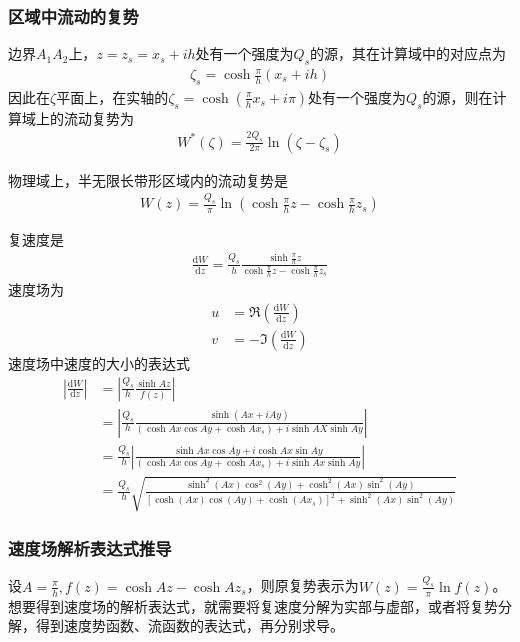 \subsubsection{区域中流动的复势}
边界$A_{1}A_{2}$上，$z=z_{s}=x_{s}+ih$处有一个强度为$Q_{s}$的源，其在计算域中的对应点为
\begin{align}
    \zeta_{s}=\cosh\frac{\pi}{h}(x_{s }+ih)
\end{align}
因此在$\zeta$平面上，在实轴的$\zeta_{s}=\cosh(\frac{\pi}{h}x_{s}+i\pi)$处有一个强度为$Q_{s}$的源，则在计算域上的流动复势为
\begin{align}
    W^{*}(\zeta)=\frac{2Q_{s}}{2\pi}\ln(\zeta-\zeta_{s})
\end{align}

物理域上，半无限长带形区域内的流动复势是
\begin{align}
    W(z)=\frac{Q_{s}}{\pi}\ln(\cosh\frac{\pi}{h}z-\cosh\frac{\pi}{h}z_{s})
\end{align}

复速度是
\begin{align}
    \frac{\mathrm{d}W}{\mathrm{d}z}=\frac{Q_{s}}{h}\frac{\sinh\frac{\pi}{h}z}{\cosh\frac{\pi}{h}z-\cosh\frac{\pi}{h}z_{s}}
\end{align}
速度场为
\begin{align}
    u&=\Re\left(\frac{\mathrm{d}W}{\mathrm{d}z}\right)\\
    v&=-\Im\left(\frac{\mathrm{d}W}{\mathrm{d}z}\right)
\end{align}
速度场中速度的大小的表达式
\begin{align}
    \left|\frac{\mathrm{d}W}{\mathrm{d}z}\right|&=\left|\frac{Q_{s}}{h}\frac{\sinh Az}{f(z)}\right|\\
    &=\left|\frac{Q_{s}}{h}\frac{\sinh(Ax+iAy)}{(\cosh Ax\cos Ay+\cosh Ax_{s})+i\sinh AX\sinh Ay}\right|\\
    &=\frac{Q_{s}}{h}\left|\frac{\sinh Ax\cos Ay+i\cosh Ax\sin Ay}{(\cosh Ax\cos Ay+\cosh Ax_{s})+i\sinh Ax\sinh Ay}\right|\\
    &=\frac{Q_{s}}{h}\sqrt{\frac{                        \sinh^2(Ax)\cos^2(Ay) + \cosh^2(Ax)\sin^2(Ay)}{                        \left[ \cosh(Ax)\cos(Ay) + \cosh(Ax_s) \right]^2 + \sinh^2(Ax)\sin^2(Ay)}}
\end{align}

\subsubsection*{速度场解析表达式推导}
设$A=\frac{\pi}{h},f(z)=\cosh Az-\cosh Az_{s}$，则原复势表示为$W(z)=\frac{Q_{s}}{\pi}\ln f(z)$。
想要得到速度场的解析表达式，就需要将复速度分解为实部与虚部，或者将复势分解，得到速度势函数、流函数的表达式，再分别求导。

